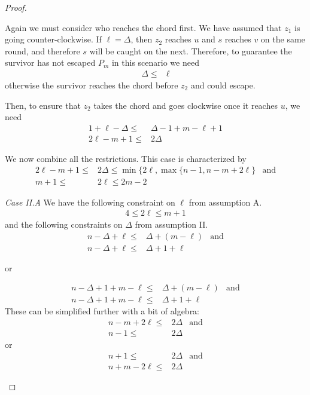 \documentclass[letterpaper, 10pt]{article}
\begin{document}
\begin{proof}
\begin{proofpart}
Again we must consider who reaches the chord first. We have assumed that $z_1$ is going counter-clockwise. If $\ell = \Delta$, then $z_2$ reaches $u$ and $s$ reaches $v$ on the same round, and therefore $s$ will be caught on the next. Therefore, to guarantee the survivor has not escaped $P_m$ in this scenario we need
\begin{align*}
  \Delta \leq & \ell
\end{align*}
otherwise the survivor reaches the chord before $z_2$ and
could escape.

Then, to ensure that $z_2$ takes the chord and goes clockwise once
it reaches $u$, we need
\begin{align*}
  1 + \ell - \Delta \leq & \Delta -1 + m - \ell + 1 \\
  2\ell - m + 1 \leq & 2 \Delta
\end{align*}

We now combine all the restrictions. This case is characterized by
\begin{align*}
  2\ell - m + 1 \leq & 2 \Delta \leq \min \{ 2\ell, \max \{ n-1, n-m+2\ell \} &\text{and}\\
m + 1 \leq & 2 \ell \leq 2m -2
\end{align*}

\textit{Case II.A} We have the following constraint on $\ell$ from
assumption A.
\begin{align*}
  4 \leq 2 \ell \leq m + 1
\end{align*}
and the following constraints on $\Delta$ from assumption II.
\begin{align*}
  n - \Delta + \ell \leq & \Delta + (m - \ell) & \text{and} \\
  n - \Delta + \ell \leq & \Delta + 1 + \ell
\end{align*}
\begin{center}or\end{center}
\begin{align*}
n - \Delta + 1 + m - \ell \leq & \Delta + (m - \ell) & \text{and} \\
 n - \Delta + 1 + m - \ell \leq & \Delta + 1 + \ell
\end{align*}
These can be simplified further with a bit of algebra:
\begin{align*}
n-m +2\ell \leq & 2 \Delta & \text{and} \\
n-1 \leq & 2\Delta
\end{align*}
or
\begin{align*}
n + 1 \leq & 2 \Delta & \text{and} \\
n + m - 2\ell \leq & 2 \Delta
\end{align*}


\end{proofpart}
\end{proof}
\end{document}
